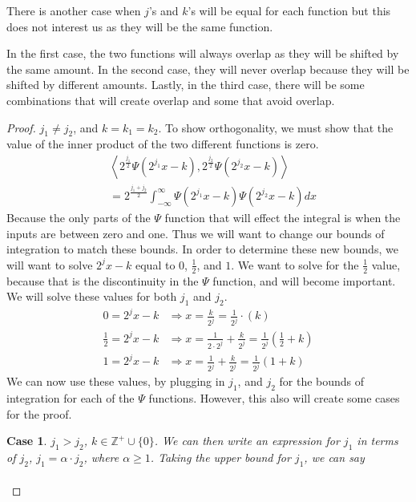\documentclass[12pt]{amsart}
\newcommand{\Z}{\mathbb{Z}}
\newtheorem{case}{Case}
\begin{document}
There is another case when $j$'s and $k$'s will be equal for each function but this does not interest us as they will be the same function. 

In the first case, the two functions will always overlap as they will be shifted by the same amount. In the second case, they will never overlap because they will be shifted by different amounts. Lastly, in the third case, there will be some combinations that will create overlap and some that avoid overlap. 

\begin{proof}\label{proof:1}
  $j_1 \neq j_2$, and $k = k_1 = k_2$. To show orthogonality, we must show that
  the value of the inner product of the two different functions is zero.
  \begin{align}
    &\left<2^{\frac{j_1}{2}}\Psi\left(2^{j_1}x-k\right),2^{\frac{j_2}{2}}\Psi\left(2^{j_2}x-k\right)\right>\\
    &=
    2^{\frac{j_1+j_2}{2}}\int_{-\infty}^{\infty}\Psi\left(2^{j_1}x-k\right)\Psi\left(2^{j_2}x-k\right)dx
  \end{align}
  Because the only parts of the $\Psi$ function that will effect the integral
  is when the inputs are between zero and one. Thus we will want to change our
  bounds of integration to match these bounds. In order to determine these new
  bounds, we will want to solve $2^{j}x-k$ equal to $0$, $\frac{1}{2}$, and
  $1$. We want to solve for the $\frac{1}{2}$ value, because that is the
  discontinuity in the $\Psi$ function, and will become important. We will
  solve these values for both $j_1$ and $j_2$.
  \begin{align}
    0 = 2^jx-k &\Rightarrow x = \frac{k}{2^j} = \frac{1}{2^j}\cdot (k)\\
    \frac{1}{2} = 2^jx-k &\Rightarrow x =
    \frac{1}{2\cdot 2^j}+\frac{k}{2^j} =
    \frac{1}{2^j}\left(\frac{1}{2}+k\right)\\
    1 = 2^jx-k &\Rightarrow x = \frac{1}{2^j}+\frac{k}{2^j} = \frac{1}{2^j}(1+k)
  \end{align}
  We can now use these values, by plugging in $j_1$, and $j_2$ for the bounds
  of integration for each of the $\Psi$ functions. However, this also will
  create some cases for the proof.
  \begin{case}\label{case:1.1}
    $j_1 > j_2$, $k\in\Z^+\cup\{0\}$. We can then write an expression for $j_1$
    in terms of $j_2$, $j_1 = \alpha \cdot j_2$, where $\alpha \geq 1$. Taking
    the upper bound for $j_1$, we can say
    \begin{align}

\end{align}
\end{case}
\end{proof}
\end{document}
